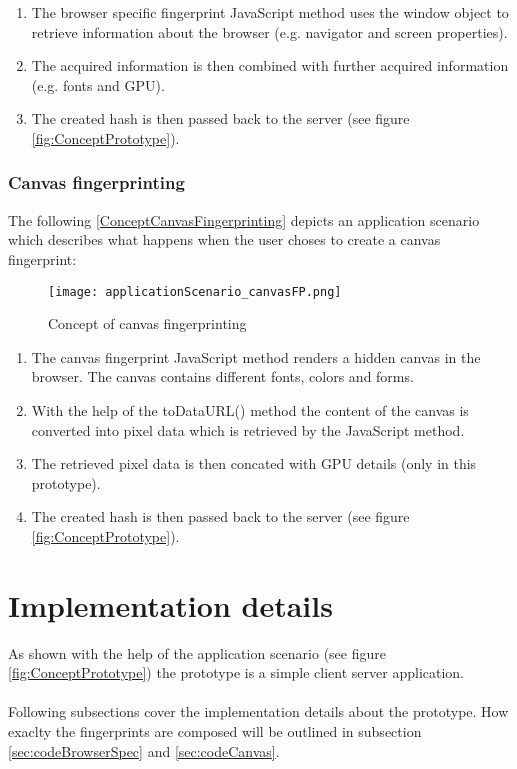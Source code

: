 \begin{enumerate}
	\item The browser specific fingerprint JavaScript method uses the window object to retrieve information about the browser (e.g. navigator and screen properties).
	\item The acquired information is then combined with further acquired information (e.g. fonts and GPU).
	\item The created hash is then passed back to the server (see figure \ref{fig:ConceptPrototype}).\\
\end{enumerate}


\subsubsection{Canvas fingerprinting}\label{sec:appCanvas}
The following \autoref{ConceptCanvasFingerprinting} depicts an application scenario which describes what happens when the user choses to create a canvas fingerprint:

\begin{figure}[H]
	\centering
	\texttt{[image: applicationScenario\_canvasFP.png]}
	\caption{Concept of canvas fingerprinting\\}
	\label{ConceptCanvasFingerprinting}
\end{figure}

\begin{enumerate}
	\item The canvas fingerprint JavaScript method renders a hidden canvas in the browser. The canvas contains different fonts, colors and forms.
	\item  With the help of the toDataURL() method the content of the canvas is converted into pixel data which is retrieved by the JavaScript method.
	\item The retrieved pixel data is then concated with GPU details (only in this prototype).
	\item The created hash is then passed back to the server (see figure \ref{fig:ConceptPrototype}).\\
\end{enumerate}


\section{Implementation details}
As shown with the help of the application scenario (see figure \ref{fig:ConceptPrototype}) the prototype is a simple client server application. \\\\
Following subsections cover the implementation details about the prototype. How exaclty the fingerprints are composed will be outlined in subsection \autoref{sec:codeBrowserSpec} and \autoref{sec:codeCanvas}.

